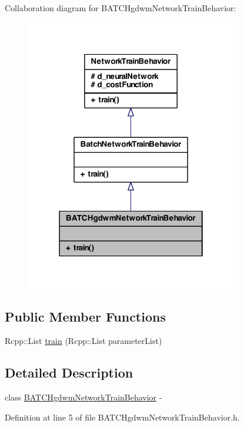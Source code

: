 Collaboration diagram for BATCHgdwmNetworkTrainBehavior:
\nopagebreak
\begin{figure}[H]
\begin{center}
\leavevmode
\includegraphics[width=262pt]{class_b_a_t_c_hgdwm_network_train_behavior__coll__graph}
\end{center}
\end{figure}
\subsection*{Public Member Functions}
\begin{DoxyCompactItemize}
\item 
Rcpp::List \hyperlink{class_b_a_t_c_hgdwm_network_train_behavior_a68c8313d5e3375c864434e27cea5b8b1}{train} (Rcpp::List parameterList)
\end{DoxyCompactItemize}


\subsection{Detailed Description}
class \hyperlink{class_b_a_t_c_hgdwm_network_train_behavior}{BATCHgdwmNetworkTrainBehavior} -\/ 

Definition at line 5 of file BATCHgdwmNetworkTrainBehavior.h.



